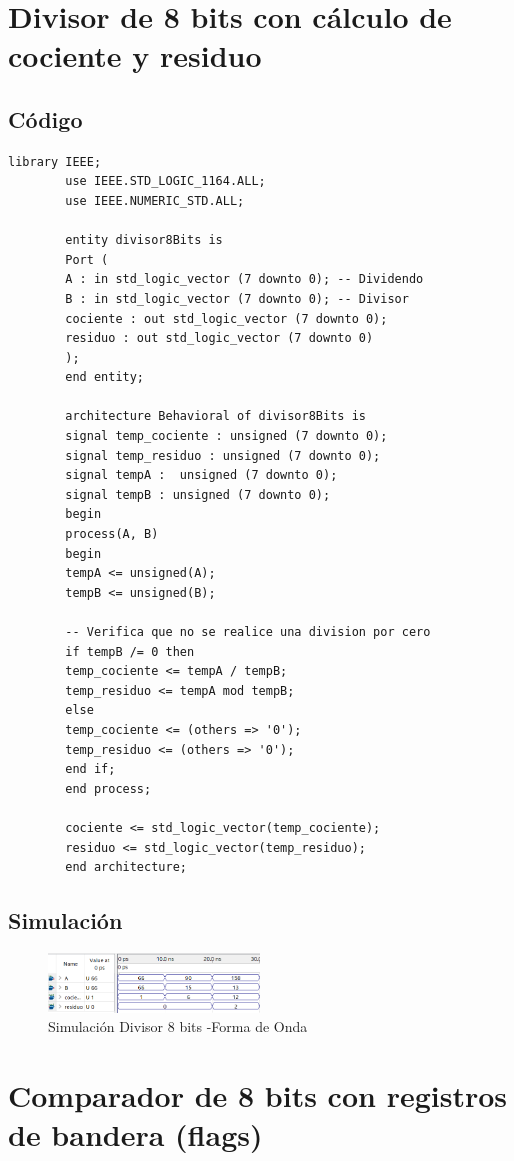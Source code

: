 \documentclass[conference]{IEEEtran}
\begin{document}
	\section{Divisor de 8 bits con cálculo de cociente y residuo}
	\subsection{Código}
	\begin{lstlisting}[numbers=none]
		library IEEE;
		use IEEE.STD_LOGIC_1164.ALL;
		use IEEE.NUMERIC_STD.ALL;
		
		entity divisor8Bits is
		Port (
		A : in std_logic_vector (7 downto 0); -- Dividendo
		B : in std_logic_vector (7 downto 0); -- Divisor
		cociente : out std_logic_vector (7 downto 0);
		residuo : out std_logic_vector (7 downto 0)
		);
		end entity;
		
		architecture Behavioral of divisor8Bits is
		signal temp_cociente : unsigned (7 downto 0);
		signal temp_residuo : unsigned (7 downto 0);
		signal tempA :  unsigned (7 downto 0);
		signal tempB : unsigned (7 downto 0);
		begin
		process(A, B)
		begin
		tempA <= unsigned(A);
		tempB <= unsigned(B);
		
		-- Verifica que no se realice una division por cero
		if tempB /= 0 then
		temp_cociente <= tempA / tempB;
		temp_residuo <= tempA mod tempB;
		else
		temp_cociente <= (others => '0');
		temp_residuo <= (others => '0');
		end if;
		end process;
		
		cociente <= std_logic_vector(temp_cociente);
		residuo <= std_logic_vector(temp_residuo);
		end architecture;
	\end{lstlisting}
	\subsection{Simulación}
	\begin{figure}[h]
		\centering
		\includegraphics[width=0.5\textwidth]{media/divisor8bits}
		\caption{Simulación Divisor 8 bits -Forma de Onda}
		\label{fig:divisor8bits}
	\end{figure}
	
	\section{Comparador de 8 bits con registros de bandera (flags)}
\end{document}
